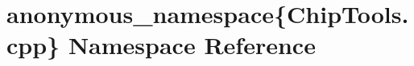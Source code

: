 \hypertarget{namespaceanonymous__namespace_02ChipTools_8cpp_03}{}\section{anonymous\+\_\+namespace\{Chip\+Tools.\+cpp\} Namespace Reference}
\label{namespaceanonymous__namespace_02ChipTools_8cpp_03}

